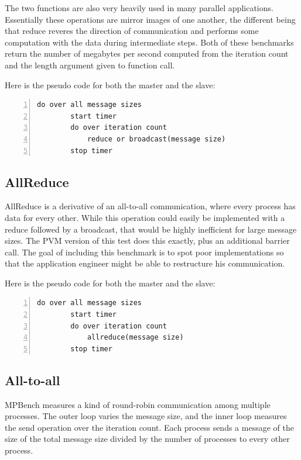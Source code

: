 The two functions are also very heavily used in many parallel applications.
Essentially these operations are mirror images of one another, the different
being that reduce reveres the direction of communication and performs some
computation with the data during intermediate steps. Both of these
benchmarks return the number of megabytes per second computed from the
iteration count and the length argument given to function call.

Here is the pseudo code for both the master and the slave:


\begin{lstlisting}[frame=single,numbers=left]
   do over all message sizes 
        start timer
        do over iteration count
            reduce or broadcast(message size)
        stop timer
\end{lstlisting}

\subsection{AllReduce}

AllReduce is a derivative of an all-to-all communication, where every
process has data for every other. While this operation could easily be
implemented with a reduce followed by a broadcast, that would be highly
inefficient for large message sizes. The PVM version of this test does this
exactly, plus an additional barrier call. The goal of including this
benchmark is to spot poor implementations so that the application engineer
might be able to restructure his communication.

Here is the pseudo code for both the master and the slave:

\begin{lstlisting}[frame=single,numbers=left]
    do over all message sizes 
        start timer
        do over iteration count 
            allreduce(message size) 
        stop timer
\end{lstlisting}


\subsection{All-to-all}

MPBench measures a kind of round-robin communication among multiple
processes. The outer loop varies the message size, and the inner loop
measures the send operation over the iteration count. Each process sends a
message of the size of the total message size divided by the number of
processes to every other process.

